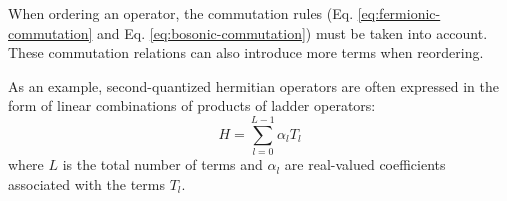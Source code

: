 When ordering an operator, the commutation rules (Eq. \ref{eq:fermionic-commutation} and Eq. \ref{eq:bosonic-commutation}) must be taken into account.
These commutation relations can also introduce more terms when reordering.

As an example, second-quantized hermitian operators are often expressed in the form of linear combinations of products of ladder operators:
\begin{equation}
    \label{eq:lclo}
    H = \sum_{l=0}^{L-1} \alpha_l T_l
\end{equation}
where $L$ is the total number of terms and $\alpha_l$ are real-valued  coefficients associated with the terms $T_l$.
